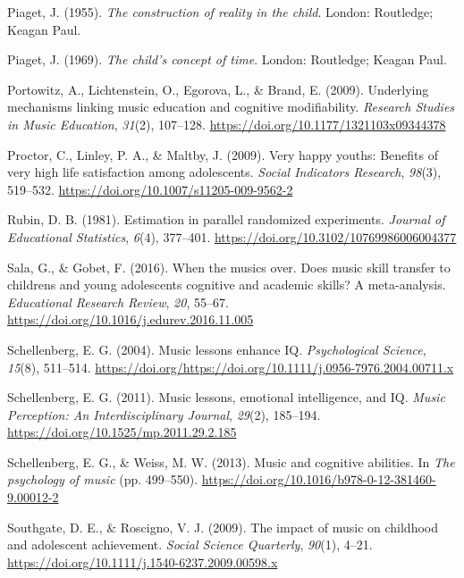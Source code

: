 \documentclass[a4, 12pt]{article}
\begin{document}
\leavevmode\hypertarget{ref-Piaget1955}{}%
Piaget, J. (1955). \emph{The construction of reality in the child}. London: Routledge; Keagan Paul.

\leavevmode\hypertarget{ref-Piaget1969}{}%
Piaget, J. (1969). \emph{The child's concept of time}. London: Routledge; Keagan Paul.

\leavevmode\hypertarget{ref-Portowitz2009}{}%
Portowitz, A., Lichtenstein, O., Egorova, L., \& Brand, E. (2009). Underlying mechanisms linking music education and cognitive modifiability. \emph{Research Studies in Music Education}, \emph{31}(2), 107--128. \url{https://doi.org/10.1177/1321103x09344378}

\leavevmode\hypertarget{ref-Proctor2009a}{}%
Proctor, C., Linley, P. A., \& Maltby, J. (2009). Very happy youths: Benefits of very high life satisfaction among adolescents. \emph{Social Indicators Research}, \emph{98}(3), 519--532. \url{https://doi.org/10.1007/s11205-009-9562-2}

\leavevmode\hypertarget{ref-Rubin1981}{}%
Rubin, D. B. (1981). Estimation in parallel randomized experiments. \emph{Journal of Educational Statistics}, \emph{6}(4), 377--401. \url{https://doi.org/10.3102/10769986006004377}

\leavevmode\hypertarget{ref-Sala2016}{}%
Sala, G., \& Gobet, F. (2016). When the musics over. Does music skill transfer to childrens and young adolescents cognitive and academic skills? A meta-analysis. \emph{Educational Research Review}, \emph{20}, 55--67. \url{https://doi.org/10.1016/j.edurev.2016.11.005}

\leavevmode\hypertarget{ref-Schellenberg2004}{}%
Schellenberg, E. G. (2004). Music lessons enhance IQ. \emph{Psychological Science}, \emph{15}(8), 511--514. \url{https://doi.org/https://doi.org/10.1111/j.0956-7976.2004.00711.x}

\leavevmode\hypertarget{ref-Schellenberg2011a}{}%
Schellenberg, E. G. (2011). Music lessons, emotional intelligence, and IQ. \emph{Music Perception: An Interdisciplinary Journal}, \emph{29}(2), 185--194. \url{https://doi.org/10.1525/mp.2011.29.2.185}

\leavevmode\hypertarget{ref-Schellenberg2013}{}%
Schellenberg, E. G., \& Weiss, M. W. (2013). Music and cognitive abilities. In \emph{The psychology of music} (pp. 499--550). \url{https://doi.org/10.1016/b978-0-12-381460-9.00012-2}

\leavevmode\hypertarget{ref-Southgate2009}{}%
Southgate, D. E., \& Roscigno, V. J. (2009). The impact of music on childhood and adolescent achievement. \emph{Social Science Quarterly}, \emph{90}(1), 4--21. \url{https://doi.org/10.1111/j.1540-6237.2009.00598.x}
\end{document}

